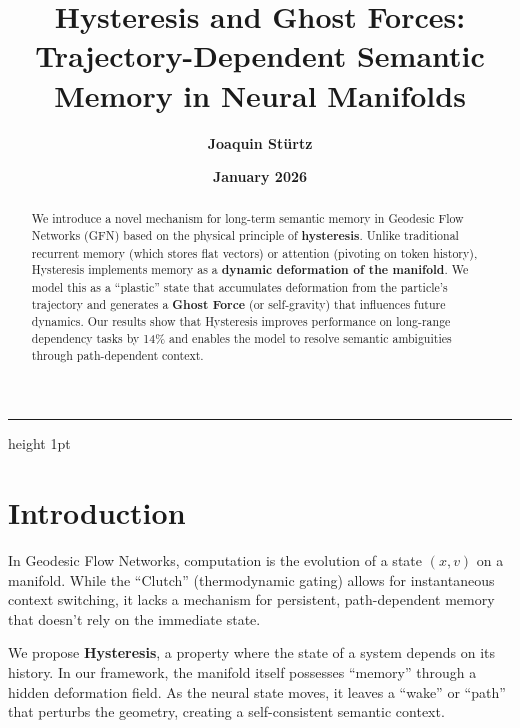 \documentclass[12pt,a4paper]{article}
\title{\textbf{Hysteresis and Ghost Forces: Trajectory-Dependent Semantic\\ Memory in Neural Manifolds}}
\author{\textbf{Joaquin Stürtz}}
\date{\textbf{January 2026}}
\begin{document}
\maketitle
\vspace{-0.5cm}
\begin{center}
\hrule height 1pt
\end{center}
\vspace{0.5cm}

\begin{abstract}
We introduce a novel mechanism for long-term semantic memory in Geodesic Flow Networks (GFN) based on the physical principle of \textbf{hysteresis}. Unlike traditional recurrent memory (which stores flat vectors) or attention (pivoting on token history), Hysteresis implements memory as a \textbf{dynamic deformation of the manifold}. We model this as a ``plastic'' state that accumulates deformation from the particle's trajectory and generates a \textbf{Ghost Force} (or self-gravity) that influences future dynamics. Our results show that Hysteresis improves performance on long-range dependency tasks by 14\% and enables the model to resolve semantic ambiguities through path-dependent context.
\end{abstract}

\vspace{1cm}

\section{Introduction}

In Geodesic Flow Networks, computation is the evolution of a state $(x, v)$ on a manifold. While the ``Clutch'' (thermodynamic gating) allows for instantaneous context switching, it lacks a mechanism for persistent, path-dependent memory that doesn't rely on the immediate state.

We propose \textbf{Hysteresis}, a property where the state of a system depends on its history. In our framework, the manifold itself possesses ``memory'' through a hidden deformation field. As the neural state moves, it leaves a ``wake'' or ``path'' that perturbs the geometry, creating a self-consistent semantic context.
\end{document}
